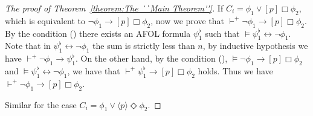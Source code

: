 \documentclass{fcs}
\newcommand{\la}[0]{\langle}
\newcommand{\ra}[0]{\rangle}
\newcommand{\rmn}[1]{(\romannumeral#1)}
\newcommand{\reld}[0]{\mathit{\vdash^+}}
\begin{document}
\begin{proof}[The proof of Theorem~\ref{theorem:The ``Main Theorem''}]
If $C_i = \phi_1\vee [p]\Box\phi_2$, which is equivalent to $\neg \phi_1\to [p]\Box\phi_2$, now we prove that $\reld \neg \phi_1\to [p]\Box\phi_2$.
By the condition \rmn{1} there exists an AFOL formula $\psi^\flat_1$ such that $\models \psi^\flat_1\leftrightarrow \neg \phi_1$.
Note that in $\psi^\flat_1\leftrightarrow \neg \phi_1$ the sum is strictly less than $n$, by inductive hypothesis we have $\reld \neg \phi_1\to \psi^\flat_1$.
On the other hand,
by the condition \rmn{4}, $\models \neg\phi_1\to [p]\Box\phi_2$ and $\models \psi^\flat_1\leftrightarrow \neg \phi_1$, we have that $\reld\psi^\flat_1\to [p]\Box\phi_2$ holds. Thus we have $\reld\neg\phi_1\to [p]\Box\phi_2$.

Similar for the case $C_i = \phi_1\vee \la p\ra \Diamond\phi_2$.

\end{proof}

\end{document}
